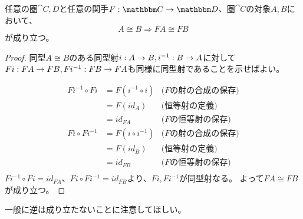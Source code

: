 	\begin{prop}[関手の同型の保存]
		任意の圏$\cat{C,D}$と任意の関手$\functor{F}{C}{D}$、圏$\cat{C}$の対象$A,B$において、
		\[A\cong B \Longrightarrow FA\cong FB\]が成り立つ。
	\end{prop}
	\begin{proof}
		同型$A\cong B$のある同型射$i:A\rightarrow B,i^{-1}:B\rightarrow A$に対して$Fi:FA\rightarrow FB,Fi^{-1}:FB\rightarrow FA$も同様に同型射であることを示せばよい。

		\begin{align*}
			Fi^{-1}\circ Fi&=F(i^{-1}\circ i)&\text{($F$の射の合成の保存)}\\
			&=F(id_A)&\text{(恒等射の定義)}\\
			&=id_{FA}&\text{($F$の恒等射の保存)}\\
			Fi\circ Fi^{-1}&=F(i\circ i^{-1})&\text{($F$の射の合成の保存)}\\
			&=F(id_B)&\text{(恒等射の定義)}\\
			&=id_{FB}&\text{($F$の恒等射の保存)}\\
		\end{align*}
		$Fi^{-1}\circ Fi=id_{FA}$、$Fi\circ Fi^{-1}=id_{FB}$より、$Fi,Fi^{-1}$が同型射なる。
		よって$FA\cong FB$が成り立つ。
	\end{proof}
  一般に逆は成り立たないことに注意してほしい。
	
	
	
  